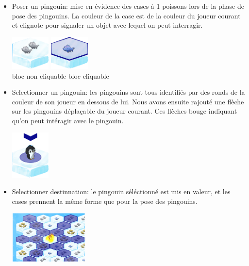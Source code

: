 \documentclass{report}
\begin{document}
\begin{itemize}
\item Poser un pingouin: mise en évidence des cases à 1 poissons lors de la phase de pose des pingouins. La couleur de la case est de la couleur du joueur courant et clignote pour signaler un objet avec lequel on peut interragir.
  \begin{center}
    
    \includegraphics[width=2cm]{image/bloc_simple.png}    
    \hspace{1cm}
    \includegraphics[width=2cm]{image/bloc_mev.png}
    \\
    bloc non cliquable \hspace{0.5cm} bloc cliquable
  \end{center}

\item Selectionner un pingouin: les pingouins sont tous identifiés par des ronds de la couleur de son joueur en dessous de lui. Nous avons ensuite rajouté une flèche sur les pingouins déplaçable du joueur courant. Ces flèches bouge indiquant qu'on peut intéragir avec le pingouin.
  \begin{center}
    \includegraphics[width=2cm]{image/bloc_pingouin.png}    
  \end{center}

\item Selectionner destinnation: le pingouin séléctionné est mis en valeur, et les cases prennent la même forme que pour la pose des pingouins.
  \begin{center}
    \includegraphics[width=4cm]{image/case_select_dest.png}    
  \end{center}
\end{itemize}
\end{document}
